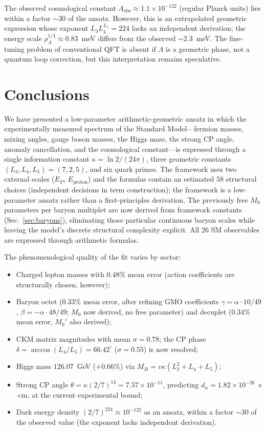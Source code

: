 \documentclass[aps,prd,reprint,twocolumn,showpacs,superscriptaddress]{revtex4-2}
\begin{document}
The observed cosmological constant $\Lambda_{\text{obs}} \approx
1.1 \times 10^{-122}$ (regular Planck units) lies within a factor
$\sim 30$ of the ansatz.  However, this is an extrapolated geometric
expression whose exponent $L_3 L_4^{L_5} = 224$ lacks an independent
derivation; the energy scale $\rho_\Lambda^{1/4} \approx 0.83$~meV
differs from the observed $\sim 2.3$~meV.  The fine-tuning problem
of conventional QFT is absent if $\Lambda$ is a geometric phase,
not a quantum loop correction, but this interpretation remains
speculative.

\section{Conclusions}
\label{sec:conclusions}

We have presented a low-parameter arithmetic-geometric ansatz in which
the experimentally measured spectrum of the Standard Model---fermion
masses, mixing angles, gauge boson masses, the Higgs mass, the strong
CP angle, anomaly cancellation, and the cosmological constant---is
expressed through a single information constant
$\kappa = \ln 2/(24\pi)$, three geometric constants
$(L_3, L_4, L_5) = (7, 2, 5)$, and six quark primes.
The framework uses two external scales ($E_P$, $E_{\text{proton}}$)
and the formulas contain an estimated 58 structural choices (independent
decisions in term construction); the framework is a low-parameter ansatz
rather than a first-principles derivation.  The previously free $M_0$
parameters per baryon multiplet are now derived from framework constants
(Sec.~\ref{sec:baryons}), eliminating those particular continuous baryon scales while leaving the model's discrete structural complexity explicit.
All 26 SM observables are expressed through arithmetic formulas.

The phenomenological quality of the fit varies by sector:
\begin{itemize}
\item Charged lepton masses with $0.48\%$ mean error (action
coefficients are structurally chosen, however);
\item Baryon octet ($0.33\%$ mean error, after refining GMO coefficients
$\gamma = \alpha\cdot 10/49$, $\beta = -\alpha\cdot 48/49$; $M_0$ now
derived, no free parameter) and decuplet ($0.34\%$ mean error, $M_0'$
also derived);
\item CKM matrix magnitudes with mean $\sigma = 0.78$; the CP phase
$\delta = \arccos(L_4/L_5) = 66.42^\circ$ ($\sigma = 0.55$) is now
resolved;
\item Higgs mass $126.07$~GeV ($+0.66\%$) via $M_H = v\kappa(L_3^2+L_4+L_5)$;
\item Strong CP angle $\theta = \kappa(2/7)^{14} = 7.57 \times 10^{-11}$,
predicting $d_n = 1.82 \times 10^{-26}$~e$\cdot$cm, at the current
experimental bound;
\item Dark energy density $(2/7)^{224} \approx 10^{-122}$ as an ansatz,
within a factor $\sim 30$ of the observed value (the exponent lacks
independent derivation).
\end{itemize}
\end{document}
